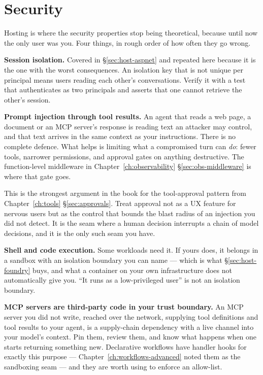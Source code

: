 \section{Security}
\label{sec:host-security}

Hosting is where the security properties stop being theoretical, because until
now the only user was you. Four things, in rough order of how often they go
wrong.

\textbf{Session isolation.} Covered in \S\ref{sec:host-aspnet} and repeated here
because it is the one with the worst consequences. An isolation key that is not
unique per principal means users reading each other's conversations. Verify it
with a test that authenticates as two principals and asserts that one cannot
retrieve the other's session.

\textbf{Prompt injection through tool results.} An agent that reads a web page, a
document or an MCP server's response is reading text an attacker may control, and
that text arrives in the same context as your instructions. There is no complete
defence. What helps is limiting what a compromised turn can \emph{do}: fewer
tools, narrower permissions, and approval gates on anything destructive. The
function-level middleware in Chapter~\ref{ch:observability} \S\ref{sec:obs-middleware}
is where that gate goes.

\begin{warning}
This is the strongest argument in the book for the tool-approval pattern from
Chapter~\ref{ch:tools} \S\ref{sec:approvals}. Treat approval not as a UX feature
for nervous users but as the control that bounds the blast radius of an
injection you did not detect. It is the seam where a human decision interrupts a
chain of model decisions, and it is the only such seam you have.
\end{warning}

\textbf{Shell and code execution.} Some workloads need it. If yours does, it
belongs in a sandbox with an isolation boundary you can name --- which is what
\S\ref{sec:host-foundry} buys, and what a container on your own infrastructure
does not automatically give you. ``It runs as a low-privileged user'' is not an
isolation boundary.

\textbf{MCP servers are third-party code in your trust boundary.} An MCP server
you did not write, reached over the network, supplying tool definitions and tool
results to your agent, is a supply-chain dependency with a live channel into your
model's context. Pin them, review them, and know what happens when one starts
returning something new. Declarative workflows have handler hooks for exactly
this purpose --- Chapter~\ref{ch:workflows-advanced} noted them as the sandboxing
seam --- and they are worth using to enforce an allow-list.

